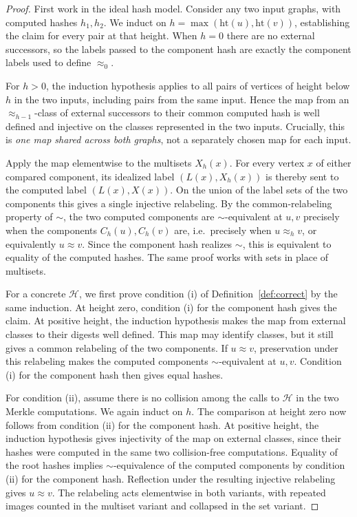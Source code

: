 \documentclass[twoside,leqno]{article}
\newcommand{\hgt}{\mathrm{ht}}
\begin{document}
\begin{proof}
First work in the ideal hash model. Consider any two input graphs, with computed hashes $h_1,h_2$. We induct on $h=\max(\hgt(u),\hgt(v))$, establishing the claim for every pair at that height. When $h=0$ there are no external successors, so the labels passed to the component hash are exactly the component labels used to define $\approx_0$.

For $h>0$, the induction hypothesis applies to all pairs of vertices of height below $h$ in the two inputs, including pairs from the same input. Hence the map from an $\approx_{h-1}$-class of external successors to their common computed hash is well defined and injective on the classes represented in the two inputs. Crucially, this is \emph{one map shared across both graphs}, not a separately chosen map for each input.

Apply the map elementwise to the multisets $X_h(x)$. For every vertex $x$ of either compared component, its idealized label $(L(x),X_h(x))$ is thereby sent to the computed label $(L(x),X(x))$. On the union of the label sets of the two components this gives a single injective relabeling. By the common-relabeling property of $\sim$, the two computed components are $\sim$-equivalent at $u,v$ precisely when the components $C_h(u),C_h(v)$ are, i.e.\ precisely when $u\approx_h v$, or equivalently $u\approx v$. Since the component hash realizes $\sim$, this is equivalent to equality of the computed hashes. The same proof works with sets in place of multisets.

For a concrete $\mathcal{H}$, we first prove condition (i) of Definition~\ref{def:correct} by the same induction. At height zero, condition (i) for the component hash gives the claim. At positive height, the induction hypothesis makes the map from external classes to their digests well defined. This map may identify classes, but it still gives a common relabeling of the two components. If $u\approx v$, preservation under this relabeling makes the computed components $\sim$-equivalent at $u,v$. Condition (i) for the component hash then gives equal hashes.

For condition (ii), assume there is no collision among the calls to $\mathcal{H}$ in the two Merkle computations. We again induct on $h$. The comparison at height zero now follows from condition (ii) for the component hash. At positive height, the induction hypothesis gives injectivity of the map on external classes, since their hashes were computed in the same two collision-free computations. Equality of the root hashes implies $\sim$-equivalence of the computed components by condition (ii) for the component hash. Reflection under the resulting injective relabeling gives $u\approx v$. The relabeling acts elementwise in both variants, with repeated images counted in the multiset variant and collapsed in the set variant.
\end{proof}
\end{document}

